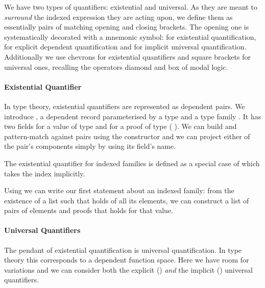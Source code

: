 We have two types of quantifiers: existential and universal. As they are
meant to \emph{surround} the indexed expression they are acting upon, we
define them as essentially pairs of matching opening and closing brackets.
The opening one is systematically decorated with a mnemonic symbol: 
for existential quantification,  for explicit dependent quantification
and  for implicit universal quantification. Additionally we use chevrons
for existential quantifiers and square brackets for universal ones, recalling
the operators diamond and box of modal logic.

\paragraph{Existential Quantifier}\label{def:sigma} In type theory, existential
quantifiers are represented as dependent pairs. We introduce , a dependent
record parameterised by a type  and a type family . It has two fields
 for a value of type  and  for a proof of type
{( )}. We can build and pattern-match against pairs using the
constructor \AIC{\_,\_} and we can project either of the pair's components simply
by using its field's name.


The existential quantifier for indexed families is defined as a special
case of  which takes the index  implicitly.


Using  we can write our first statement about an indexed family:
from the existence of a list such that  holds of all its elements,
we can construct a list of pairs of elements and proofs that  holds
for that value.


\paragraph{Universal Quantifiers}\label{par:universalquantifiers}
The pendant of existential quantification
is universal quantification. In type theory this corresponds to a dependent
function space. Here we have room for variations and we can consider both
the explicit () \emph{and} the implicit () universal
quantifiers.


